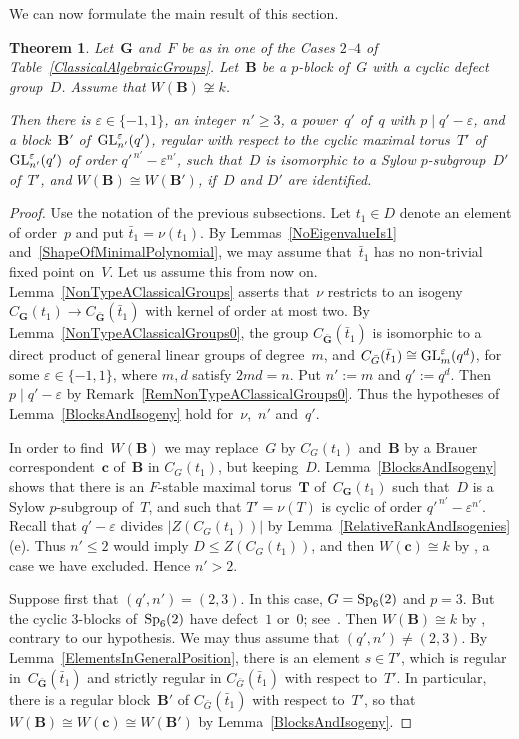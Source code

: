 \documentclass[12pt]{amsart}
\newcommand{\bG}{{\mathbf{G}}}      %
\newcommand{\bB}{{\mathbf{B}}}
\newcommand{\bT}{{\mathbf{T}}}
\newcommand{\bc}{{\mathbf{c}}}
\def\GL{ \text{\rm GL} }
\def\Sp{ \text{\rm Sp} }
\newtheorem{thm}{Theorem}[subsection]
\theoremstyle{theorem}
\theoremstyle{definition}
\theoremstyle{remark}
\begin{document}
We can now formulate the main result of this section.
\begin{thm}
\label{MainCorReduction}
Let~$\bG$ and~$F$ be as in one of the Cases $2$--$4$ of 
{\rm Table~\ref{ClassicalAlgebraicGroups}}. Let~$\bB$ be a $p$-block of~$G$ 
with a cyclic defect group~$D$. Assume that $W( \bB ) \not\cong k$. 

Then there is $\varepsilon \in \{ -1, 1\}$, an integer~$n' \geq 3$, a power~$q'$ 
of~$q$ with $p \mid q' - \varepsilon$, and a block~$\bB'$ 
of~$\GL^{\varepsilon}_{n'}(q')$, regular with respect to the cyclic maximal 
torus~$T'$ of~$\GL^{\varepsilon}_{n'}(q')$ of order 
${q'}^{\,n'} - \varepsilon^{n'}$, such that~$D$ is isomorphic to a Sylow 
$p$-subgroup~$D'$ of~$T'$, and $W( \bB ) \cong W( \bB' )$, if~$D$ and $D'$ are 
identified.
\end{thm}
\begin{proof}
Use the notation of the previous subsections. Let $t_1 \in D$ denote an element 
of order~$p$ and put $\bar{t}_1 = \nu(t_1)$. By Lemmas~\ref{NoEigenvalueIs1}
and~\ref{ShapeOfMinimalPolynomial}, we may assume that~$\bar{t}_1$ has no 
non-trivial fixed point on~$V$. Let us assume this from now on. 
Lemma~\ref{NonTypeAClassicalGroups} asserts that~$\nu$ restricts to an isogeny 
$C_{\bG}( t_1 ) \rightarrow C_{\bar{\bG}}( \bar{t}_1 )$ with kernel of 
order at most two. By Lemma~\ref{NonTypeAClassicalGroups0}, the group 
$C_{\bar{\bG}}( \bar{t}_1 )$ is isomorphic to a direct product of general linear 
groups of degree~$m$, and $C_{\bar{G}}( \bar{t}_1 ) \cong 
\GL_m^{\varepsilon}(q^d)$, for some $\varepsilon \in \{ - 1, 1 \}$, where
$m, d$ satisfy $2md = n$. Put $n' := m$ and $q' := q^d$. Then 
$p \mid q' - \varepsilon$ by Remark~\ref{RemNonTypeAClassicalGroups0}. Thus the
hypotheses of Lemma~\ref{BlocksAndIsogeny} hold for~$\nu$,~$n'$ and~$q'$.

In order to find~$W(\bB)$ we may replace~$G$ by $C_G(t_1)$ and~$\bB$ by a Brauer
correspondent~$\bc$ of~$\bB$ in $C_G( t_1 )$, but keeping~$D$. 
Lemma~\ref{BlocksAndIsogeny} shows that there is an $F$-stable maximal 
torus~$\bT$ of~$C_{\bG}( t_1 )$ such that~$D$ is a Sylow $p$-subgroup of~$T$,
and such that $T' = \nu(T)$ is cyclic of order ${q'}^{\,n'} - \varepsilon^{n'}$. 
Recall that $q' - \varepsilon$ divides $|Z( C_G( t_1 ) )|$ by 
Lemma~\ref{RelativeRankAndIsogenies}(e). Thus $n' \leq 2$ would imply 
$D \leq Z( C_G( t_1 ) )$, and then $W( \bc ) \cong k$ by 
\cite[Lemma~$3.6$(b)]{HL24}, a case we have excluded. Hence $n' > 2$.

Suppose first that $(q',n') = (2,3)$. In this case, $G = \Sp_6(2)$ and $p = 3$. 
But the cyclic $3$-blocks of~$\Sp_6(2)$ have defect~$1$ or~$0$; 
see~\cite{GAP04}. Then $W( \bB ) \cong k$ by \cite[Lemma~$3.6$(b)]{HL24}, 
contrary to our hypothesis. We may thus assume that $(q',n') \neq (2,3)$. By 
Lemma~\ref{ElementsInGeneralPosition}, there is an element $s \in T'$, which is
regular in~$C_{\bar{\bG}}( \bar{t}_1 )$ and strictly regular in 
$C_{\bar{G}}( \bar{t}_1 )$ with respect to~$T'$. In particular, there is a 
regular block~$\bB'$ of $C_{\bar{G}}( \bar{t}_1 )$ with respect to~$T'$, so 
that $W(\bB) \cong W( \bc ) \cong W( \bB' )$ by Lemma~\ref{BlocksAndIsogeny}. 
\end{proof}
\end{document}
